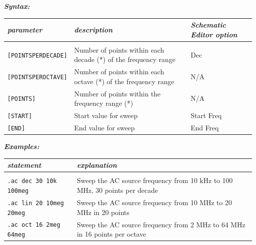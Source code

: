 
\textbf{\textit{Syntax:}}


\begin{tabular}{lp{5.5cm}p{5cm}}
\textit{parameter} & \textit{description} & \textit{Schematic Editor option}\\ \hline \\ \vspace{-0.8\parskip}
\texttt{[POINTSPERDECADE]} & Number of points within each decade (*) of the frequency range& \textsf{Dec} \\
\texttt{[POINTSPEROCTAVE]} & Number of points within each octave (*) of the frequency range& \textsf{N/A} \\
\texttt{[POINTS]} & Number of points within the frequency range (*) & \textsf{N/A} \\
\texttt{[START]} & Start value for sweep & \textsf{Start Freq} \\
\texttt{[END]} & End value for sweep & \textsf{End Freq} \\
\end{tabular}

\vspace{0.5\parskip}
\vspace{0.5\parskip}

\textbf{\textit{Examples:}}

\begin{tabular}{p{5cm}p{8cm}}
\textit{statement} & \textit{explanation} \\ \hline \\ \vspace{-0.8\parskip} 
\texttt{.ac dec 30 10k 100meg} & {\small Sweep the AC source frequency from 10 kHz to 100 MHz, 30 points per decade} \\
\texttt{.ac lin 20 10meg 20meg} & {\small Sweep the AC source frequency from 10 MHz to 20 MHz in 20 points} \\
\texttt{.ac oct 16 2meg 64meg} & {\small Sweep the AC source frequency from 2 MHz to 64 MHz in 16 points per octave} \\
\end{tabular}

